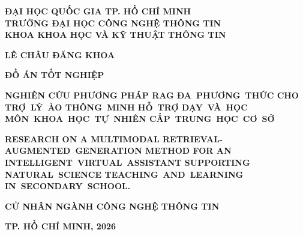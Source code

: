 \begin{titlepage}

    \begin{center}
        {\fontsize{15pt}{16pt}\selectfont \textbf{ĐẠI HỌC QUỐC GIA TP. HỒ CHÍ MINH \\ TRƯỜNG ĐẠI HỌC CÔNG NGHỆ THÔNG TIN \\ KHOA KHOA HỌC VÀ KỸ THUẬT THÔNG TIN}\par}
    \end{center}

    \vfill
    \begin{center}
        {\fontsize{15pt}{16pt}\selectfont \textbf{LÊ CHÂU ĐĂNG KHOA}\par}
    \end{center}

    \vfill
    \begin{center}
        {\fontsize{15pt}{20pt}\selectfont \textbf{ĐỒ ÁN TỐT NGHIỆP}\par}
        
        \vspace{5pt}
        \begin{minipage}{0.9\linewidth}
            \centering
            {\fontsize{16pt}{22pt}\selectfont \textbf{NGHIÊN CỨU PHƯƠNG PHÁP RAG ĐA~PHƯƠNG~THỨC CHO TRỢ~LÝ~ẢO THÔNG~MINH HỖ~TRỢ DẠY~VÀ~HỌC MÔN~KHOA~HỌC~TỰ~NHIÊN CẤP~TRUNG~HỌC~CƠ~SỞ}\par}
            
            \vspace{8pt}
            {\fontsize{13pt}{18pt}\selectfont \textbf{RESEARCH ON A MULTIMODAL RETRIEVAL-AUGMENTED~GENERATION METHOD FOR AN INTELLIGENT~VIRTUAL~ASSISTANT SUPPORTING NATURAL~SCIENCE TEACHING~AND~LEARNING IN~SECONDARY~SCHOOL.}\par}
        \end{minipage}
    \end{center}

    \vfill
    \begin{center}
        {\fontsize{15pt}{18pt}\selectfont \textbf{CỬ NHÂN NGÀNH CÔNG NGHỆ THÔNG TIN}\par}
    \end{center}

    \vfill
    \begin{center}
        {\fontsize{13pt}{17pt}\selectfont \textbf{TP. HỒ CHÍ MINH, 2026}\par}
    \end{center}
\end{titlepage}
\restoregeometry
